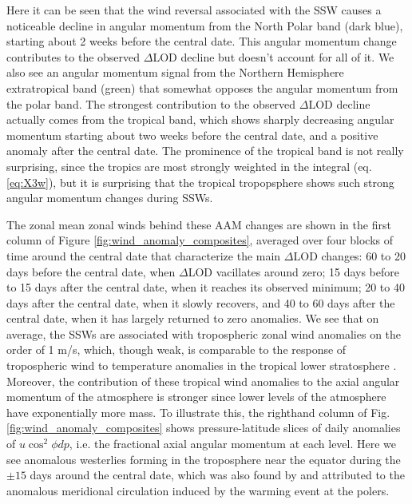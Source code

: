 \documentclass[draft,jgrga]{agutex}
\begin{document}
\begin{article}
Here it can be seen that the wind reversal associated with the SSW causes a noticeable decline in angular momentum from the North Polar band  {(dark blue)}, starting about 2 weeks before the central date.
 {This angular momentum change contributes to the observed $\Delta$LOD decline but doesn't account for all of it.}
 {We also see an  angular momentum signal from the Northern Hemisphere extratropical band (green) that somewhat opposes the angular momentum from the polar band.}
 {The strongest contribution to the observed $\Delta$LOD decline actually comes from the tropical band, which shows sharply decreasing angular momentum starting about two weeks before the central date, and a positive anomaly after the central date.
The prominence of the tropical band is not really surprising, since the tropics are most strongly weighted in the integral} (eq. \ref{eq:X3w}),  {but it is surprising that the tropical tropopsphere shows such strong angular momentum changes during SSWs.} 

The zonal mean zonal winds behind these AAM changes are shown in  {the first column of} Figure \ref{fig:wind_anomaly_composites}, averaged over four blocks of time around the central date that characterize the main $\Delta$LOD changes:  {60 to 20 days before the central date, when $\Delta$LOD vacillates around zero; 15 days before to 15 days after the central date, when it reaches its observed minimum; 20 to 40 days after the central date, when it slowly recovers, and 40 to 60 days after the central date, when it has largely returned to zero anomalies.}  
 {We see that on average, the SSWs are associated with} tropospheric zonal wind anomalies on the order of 1 m/s, which,  {though weak, is comparable} to the response of tropospheric wind to temperature anomalies in the tropical lower stratosphere \citet{Haigh2005}.
% 
 {Moreover, the contribution of these tropical wind anomalies} to the axial angular momentum of the atmosphere is stronger since lower levels of the atmosphere have exponentially more mass.
To illustrate this, the righthand column of Fig. \ref{fig:wind_anomaly_composites} shows pressure-latitude slices of daily anomalies of $u \cos^2 \phi dp$, i.e. the fractional axial angular momentum at each level.
 {Here we see anomalous westerlies forming in the troposphere near the equator during the $\pm 15$ days around the central date, which was also found by} \citet{kodera2006}  {and attributed to the anomalous meridional circulation induced by the warming event at the polers.}


\end{article}
\end{document}
